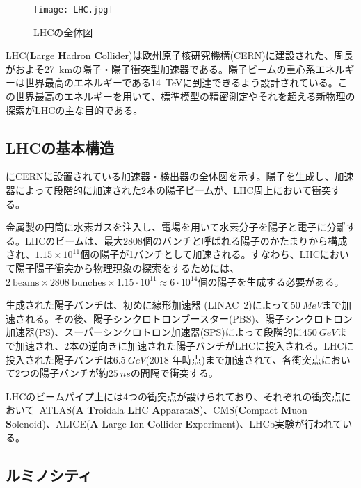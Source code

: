 \begin{figure}[tbp]
  \centering
  \texttt{[image: LHC.jpg]}
  \caption[ATLAS検出器]{LHCの全体図 \cite{LHC} }
  \label{fig:LHC}
\end{figure}


LHC(\textbf{L}arge \textbf{H}adron \textbf{C}ollider)は欧州原子核研究機構(CERN)に建設された、周長がおよそ27\ \si{km}の陽子・陽子衝突型加速器である。陽子ビームの重心系エネルギーは世界最高のエネルギーである14\ \si{TeV}に到達できるよう設計されている。この世界最高のエネルギーを用いて、標準模型の精密測定やそれを超える新物理の探索がLHCの主な目的である。

\subsection{LHCの基本構造}
にCERNに設置されている加速器・検出器の全体図を示す。陽子を生成し、加速器によって段階的に加速された2本の陽子ビームが、LHC周上において衝突する。


金属製の円筒に水素ガスを注入し、電場を用いて水素分子を陽子と電子に分離する。LHCのビームは、最大2808個のバンチと呼ばれる陽子のかたまりから構成され、$1.15\times 10^{11}$個の陽子が1バンチとして加速される。すなわち、LHCにおいて陽子陽子衝突から物理現象の探索をするためには、$2\ \mathrm{beams} \times 2808\ \mathrm{bunches}\times 1.15\cdot10^{11}\approx 6\cdot 10^{14}$個の陽子を生成する必要がある。

生成された陽子バンチは、初めに線形加速器 (LINAC\ 2)によって$50\ \si{MeV}$まで加速される。その後、陽子シンクロトロンブースター(PBS)、陽子シンクロトロン加速器(PS)、スーパーシンクロトロン加速器(SPS)によって段階的に$450\ \si{GeV}$まで加速され、2本の逆向きに加速された陽子バンチがLHCに投入される。LHCに投入された陽子バンチは$6.5\ \si{GeV}$(2018 年時点)まで加速されて、各衝突点において2つの陽子バンチが約$25\ \si{ns}$の間隔で衝突する。

LHCのビームパイプ上には4つの衝突点が設けられており、それぞれの衝突点において\ ATLAS(\textbf{A} \textbf{T}roidala \textbf{L}HC \textbf{A}pparata\textbf{S})、CMS(\textbf{C}ompact \textbf{M}uon \textbf{S}olenoid)、ALICE(\textbf{A} \textbf{L}arge \textbf{I}on \textbf{C}ollider \textbf{E}xperiment)、LHCb実験が行われている。




\subsection{ルミノシティ}
\label{sec:luminosity}


